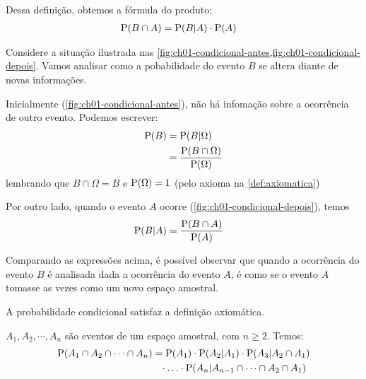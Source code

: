 Dessa definição, obtemos a fórmula do produto:
\begin{align}
    \operatorname{P}(B \cap A) &= \operatorname{P}(B | A) \cdot \operatorname{P}(A)
        \label{eq:ch01-regra-produto}
\end{align}

\begin{example}
    Considere a situação ilustrada nas
    \cref{fig:ch01-condicional-antes,fig:ch01-condicional-depois}.
    Vamos analisar como a pobabilidade do evento $B$ se altera
    diante de novas informações.

    Inicialmente (\cref{fig:ch01-condicional-antes}), não há
    infomação sobre a ocorrência de outro evento. Podemos escrever:
    \begin{align*}
        \operatorname{P}(B) &= \operatorname{P}(B | \Omega) \\
        &= \frac{\operatorname{P}(B \cap \Omega)}{\operatorname{P}(\Omega)}
    \end{align*}
    lembrando que $B \cap \Omega = B$ e $\operatorname{P}(\Omega) = 1$ (pelo axioma
     na \cref{def:axiomatica})
    
    Por outro lado, quando o evento $A$ ocorre
    (\cref{fig:ch01-condicional-depois}), temos
    \begin{align*}
        \operatorname{P}(B | A) &= \frac{\operatorname{P}(B \cap A)}{\operatorname{P}(A)} 
    \end{align*}

    Comparando as expressões acima, é possível observar
    que quando a ocorrência do evento $B$ é analisada
    dada a ocorrência do evento $A$, é como se o evento $A$
    tomasse as vezes como um novo espaço amostral.
\end{example}

\begin{lemma}
    A probabilidade condicional satisfaz a definição axiomática.
\end{lemma}

\begin{lemma}
    $A_1, A_2, \cdots, A_n$ são eventos de um espaço amostral,
    com $n \geq 2$. Temos:
    \begin{align}
        \operatorname{P}(A_1 \cap A_2 \cap \cdots \cap A_n) &=
            \operatorname{P}(A_1)
            \cdot \operatorname{P}(A_2 | A_1)
            \cdot \operatorname{P}(A_3 |A_2 \cap A_1) \notag \\
        &\phantom{=} \cdot \ldots
        \cdot \operatorname{P}(A_n | A_{n-1} \cap \cdots \cap A_2 \cap A_1)
    \end{align}
\end{lemma}

